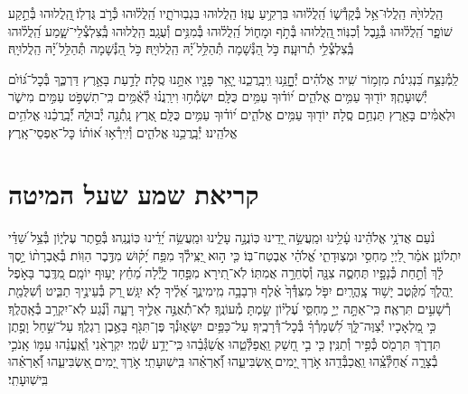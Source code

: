 \documentclass[twoside, openany, parskip=half, 11pt]{book}
\begin{document}
הַֽלֲלוּיָ֙הּ הַֽלֲלוּ־אֵ֥ל בְּ֯קָדְ֯שׁ֑וֹ הַֽ֝לֲל֗וּהוּ בִּרְקִ֥יעַ עֻזּֽוֹ׃
הַֽלֲלוּהוּ בִּגְבֽוּרֹתָ֑יו הַֽ֝לֲל֗וּהוּ כְּ֯רֹ֣ב גֻּדְלֽוֹ׃
֖הַֽלֲלוּהוּ בְּ֯תֵ֣קַע שׁוֹפָ֑ר הַֽ֝לֲל֗וּהוּ בְּ֯נֵ֣בֶל וְ֯כִנּֽוֹר׃
֖הַֽלֲלוּהוּ בְּ֯תֹ֣ף וּמָח֑וֹל הַֽ֝לֲל֗וּהוּ בְּ֯מִנִּ֥ים וְ֯עֻגָֽב׃
הַֽלֲלוּהוּ בְּֽ֯צִלְצְ֯לֵי־שָׁ֑מַע הַֽ֝לֲל֗וּהוּ בְּֽ֯צִלְצְ֯לֵ֥י תְ֯רוּעָֽה׃
כֹּ֣ל הַ֭נְּ֯שָׁמָה תְּ֯הַלֵּ֥ל ֝יָ֗הּ הַֽלֲלוּיָֽהּ׃
כֹּ֣ל הַ֭נְּ֯שָׁמָה תְּ֯הַלֵּ֥ל ֝יָ֗הּ הַֽלֲלוּיָֽהּ׃

\enlargethispage{\baselineskip}
לַֽמְ֯נַצֵּ֥ח
בִּ֝נְגִינֹ֗ת מִזְמ֥וֹר שִֽׁיר׃ אֱלֹהִ֗ים יְ֯חׇׇׇׇנֵּ֥נוּ וִֽיבָֽרֲכֵ֑נוּ יָ֤אֵ֥ר פָּנָ֖יו אִתָּ֣נוּ סֶֽלָה׃ לָדַ֣עַת בָּאָ֣רֶץ דַּרְכֶּ֑ךָ בְּ֯כׇל־גּ֝וֹיִ֗ם יְ֯שֽׁוּעָתֶֽךָ׃ יוֹד֖וּךָ עַמִּ֥ים אֱלֹהִ֑ים י֝וֹד֗וּךָ עַמִּ֥ים כֻּלָּֽם׃ יִשְׂמְ֯ח֥וּ וִירַֽנֲנ֗וּ לְ֯אֻ֫מִּ֥ים כִּֽי־תִשְׁפֹּ֣ט עַמִּ֣ים מִישֹׁ֑ר וּלְאֻמִּ֓ים בָּאָ֖רֶץ תַּנְחֵ֣ם סֶֽלָה׃ יוֹד֖וּךָ עַמִּ֥ים אֱלֹהִ֑ים י֝וֹד֗וּךָ עַמִּ֥ים כֻּלָּֽם׃ אֶ֭רֶץ נָֽתְ֯נָ֣ה יְ֯בוּלָ֑הּ יְ֝֯בָֽרֲכֵ֗נוּ אֱלֹהִ֥ים אֱלֹהֵֽינוּ׃ יְ֯בָֽרֲכֵ֥נוּ אֱלֹהִ֑ים וְ֯יִֽירְ֯א֥וּ א֝וֹת֗וֹ כׇּל־אַפְסֵי־אָֽרֶץ׃


\chapter[קריאת שמע שעל המיטה]{ קריאת שמע שעל המיטה }

\shema

\veahavta

נֹ֨עַם אֲדֹנָ֥י אֱלֹהֵ֗ינוּ עָ֫לֵ֥ינוּ וּמַֽעֲשֵׂ֣ה יָ֭דֵינוּ כּֽוֹנֲנָ֣ה עָלֵ֑ינוּ וּמַֽעֲשֵׂ֥ה יָ֝דֵ֗ינוּ כּֽוֹנֲנֵֽהוּ׃
בְּ֯סֵ֣תֶר עֶלְי֑וֹן בְּ֯צֵ֥ל שַׁ֝דַּ֗י יִתְלוֹנָֽן׃
אֹמַ֗ר לַ֭יְיָ מַחְסִ֣י וּמְצֽוּדָתִ֑י אֱ֝לֹהַ֗י אֶבְטַח־בּֽוֹ׃
כִּ֤י ה֣וּא יַ֭צִּֽילְ֯ךָ מִפַּ֥ח יָ֝ק֗וּשׁ מִדֶּ֥בֶר הַוּֽוֹת׃
בְּ֯אֶבְרָת֨וֹ יָ֣סֶךְ לָ֗ךְ וְ֯תַ֣חַת כְּ֯נָפָ֣יו תֶּחְסֶ֑ה צִנָּ֖ה וְ֯סֹֽחֵרָ֣ה אֲמִתּֽוֹ׃
לֹֽא־תִ֭ירָא מִפַּ֣חַד לָ֑יְ֯לָה מֵ֝חֵ֗ץ יָע֥וּף יוֹמָֽם׃
מִ֭דֶּֽבֶר בָּאֹ֣פֶל יַֽהֲלֹ֑ךְ מִ֝קֶּ֗טֶב יָשׁ֥וּד צָֽהֳרָֽיִם׃
יִפֹּ֤ל מִצִּדְּ֯ךָ֙ אֶ֗לֶף וּרְבָבָ֥ה מִֽימִינֶ֑ךָ אֵ֝לֶ֗יךָ לֹ֣א יִגָּֽשׁ׃
רַ֭ק בְּ֯עֵינֶ֣יךָ תַבִּ֑יט וְ֯שִׁלֻּמַ֖ת רְ֯שָׁעִ֣ים תִּרְאֶֽה׃
כִּֽי־אַתָּ֣ה יְיָ֣ מַחְסִּ֑י עֶ֝לְי֗וֹן שַׂ֣מְתָּ מְ֯עוֹנֶֽךָ׃
לֹֽא־תְ֯אֻנֶּ֣ה אֵלֶ֣יךָ רָעָ֑ה וְ֯נֶ֗֝גַע לֹֽא־יִקְרַ֥ב בְּ֯אָֽהֳלֶֽךָ׃
כִּ֣י מַ֭לְאָכָיו יְ֯צַוֶּה־לָּ֑ךְ לִ֝שְׁמָרְ֯ךָ֗ בְּ֯כׇל־דְּ֯רָכֶֽיךָ׃
עַל־כַּפַּ֥יִם יִשָּׂא֑וּנְ֯ךָ פֶּן־תִּגֹּ֖ף בָּאֶ֣בֶן רַגְלֶֽךָ׃
עַל־שַׁ֣חַל וָפֶ֣תֶן תִּדְרֹ֑ךְ תִּרְמֹ֖ס כְּ֯פִ֣יר וְ֯תַנִּֽין׃
כִּ֤י בִ֣י חָ֭שַׁק וַֽאֲפַלְּ֯טֵ֑הוּ אֲשַׂ֝גְּ֯בֵ֗הוּ כִּֽי־יָדַ֥ע שְׁ֯מִֽי׃
יִקְרָאֵ֨נִי וְֽ֯אֶֽעֱנֵ֗הוּ עִמּ֣וֹ אָֽנֹכִ֣י בְ֯צָרָ֑ה אֲ֝חַלְּ֯צֵֽ֗הוּ וַֽאֲכַבְּ֯דֵֽהוּ׃
אֹ֣רֶךְ יָ֭מִים ֖אַשְׂבִּיעֵ֑הוּ וְ֝֯אַרְאֵ֗הוּ בִּֽישֽׁוּעָתִֽי׃
אֹ֣רֶךְ יָ֭מִים ֖אַשְׂבִּיעֵ֑הוּ וְ֝֯אַרְאֵ֗הוּ בִּֽישֽׁוּעָתִֽי׃
\end{document}
